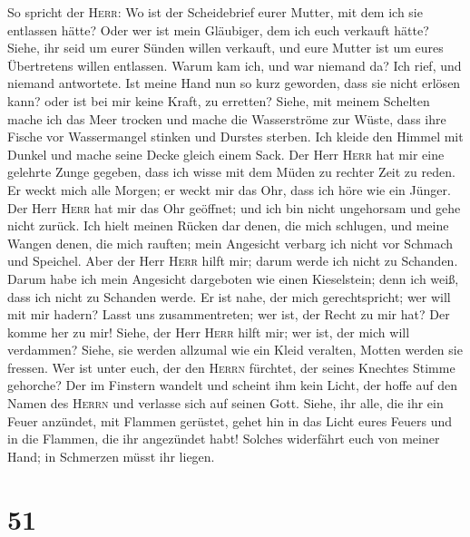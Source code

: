  So spricht der \textsc{Herr}: Wo ist der Scheidebrief
eurer Mutter, mit dem ich sie entlassen hätte? Oder wer ist mein
Gläubiger, dem ich euch verkauft hätte? Siehe, ihr seid um eurer Sünden
willen verkauft, und eure Mutter ist um eures Übertretens willen
entlassen.  Warum kam ich, und war niemand da? Ich rief,
und niemand antwortete. Ist meine Hand nun so kurz geworden, dass sie
nicht erlösen kann? oder ist bei mir keine Kraft, zu erretten? Siehe,
mit meinem Schelten mache ich das Meer trocken und mache die
Wasserströme zur Wüste, dass ihre Fische vor Wassermangel stinken und
Durstes sterben.  Ich kleide den Himmel mit Dunkel und
mache seine Decke gleich einem Sack.  Der Herr
\textsc{Herr} hat mir eine gelehrte Zunge gegeben, dass ich wisse mit
dem Müden zu rechter Zeit zu reden. Er weckt mich alle Morgen; er weckt
mir das Ohr, dass ich höre wie ein Jünger.  Der Herr
\textsc{Herr} hat mir das Ohr geöffnet; und ich bin nicht ungehorsam und
gehe nicht zurück.  Ich hielt meinen Rücken dar denen, die
mich schlugen, und meine Wangen denen, die mich rauften; mein Angesicht
verbarg ich nicht vor Schmach und Speichel.  Aber der Herr
\textsc{Herr} hilft mir; darum werde ich nicht zu Schanden. Darum habe
ich mein Angesicht dargeboten wie einen Kieselstein; denn ich weiß, dass
ich nicht zu Schanden werde.  Er ist nahe, der mich
gerechtspricht; wer will mit mir hadern? Lasst uns zusammentreten; wer
ist, der Recht zu mir hat? Der komme her zu mir!  Siehe,
der Herr \textsc{Herr} hilft mir; wer ist, der mich will verdammen?
Siehe, sie werden allzumal wie ein Kleid veralten, Motten werden sie
fressen.  Wer ist unter euch, der den \textsc{Herrn}
fürchtet, der seines Knechtes Stimme gehorche? Der im Finstern wandelt
und scheint ihm kein Licht, der hoffe auf den Namen des \textsc{Herrn}
und verlasse sich auf seinen Gott.  Siehe, ihr alle, die
ihr ein Feuer anzündet, mit Flammen gerüstet, gehet hin in das Licht
eures Feuers und in die Flammen, die ihr angezündet habt! Solches
widerfährt euch von meiner Hand; in Schmerzen müsst ihr liegen.

\hypertarget{section-50}{%
\section{51}\label{section-50}}

